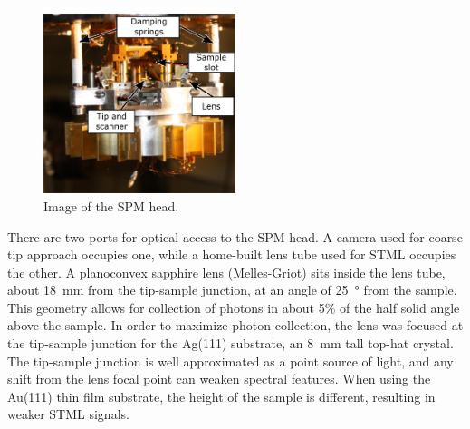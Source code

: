 \begin{figure} [h]
    \centering
    \includegraphics[width=0.5\textwidth]{pictures/spm_head_labelled.png}
    \caption{Image of the SPM head.}
    \label{fig:expsetup:head}
\end{figure}

There are two ports for optical access to the \ac{SPM} head. A camera used for coarse tip approach occupies one, while a home-built lens tube used for \ac{STML} occupies the other. A planoconvex sapphire lens (Melles-Griot) sits inside the lens tube, about \SI{18}{mm} from the tip-sample junction, at an angle of \SI{25}{\degree} from the sample. This geometry allows for collection of photons in about 5\% of the half solid angle above the sample. In order to maximize photon collection, the lens was focused at the tip-sample junction for the Ag(111) substrate, an \SI{8}{mm} tall top-hat crystal. The tip-sample junction is well approximated as a point source of light, and any shift from the lens focal point can weaken spectral features. When using the Au(111) thin film substrate, the height of the sample is different, resulting in weaker \ac{STML} signals.

